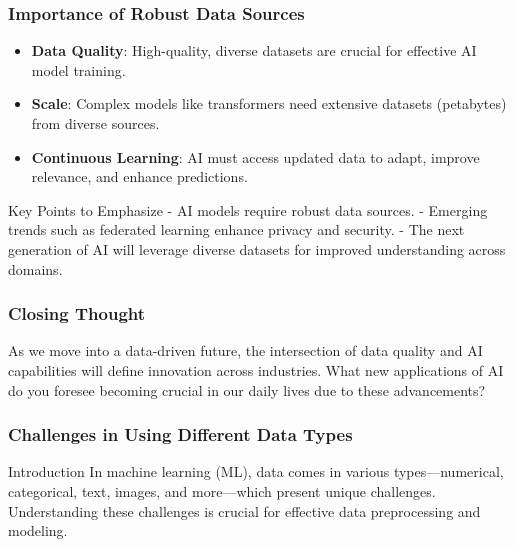 \documentclass[aspectratio=169]{beamer}
\begin{document}
\begin{frame}[fragile]
    \frametitle{Importance of Robust Data Sources}
    \begin{itemize}
        \item \textbf{Data Quality}: High-quality, diverse datasets are crucial for effective AI model training.
        \item \textbf{Scale}: Complex models like transformers need extensive datasets (petabytes) from diverse sources.
        \item \textbf{Continuous Learning}: AI must access updated data to adapt, improve relevance, and enhance predictions.
    \end{itemize}

    \begin{block}{Key Points to Emphasize}
        - AI models require robust data sources.
        - Emerging trends such as federated learning enhance privacy and security.
        - The next generation of AI will leverage diverse datasets for improved understanding across domains.
    \end{block}
\end{frame}

\begin{frame}[fragile]
    \frametitle{Closing Thought}
    As we move into a data-driven future, the intersection of data quality and AI capabilities will define innovation across industries. 
    What new applications of AI do you foresee becoming crucial in our daily lives due to these advancements?
\end{frame}

\begin{frame}[fragile]
    \frametitle{Challenges in Using Different Data Types}
    \begin{block}{Introduction}
        In machine learning (ML), data comes in various types—numerical, categorical, text, images, and more—which present unique challenges. Understanding these challenges is crucial for effective data preprocessing and modeling.
    \end{block}
\end{frame}
\end{document}
